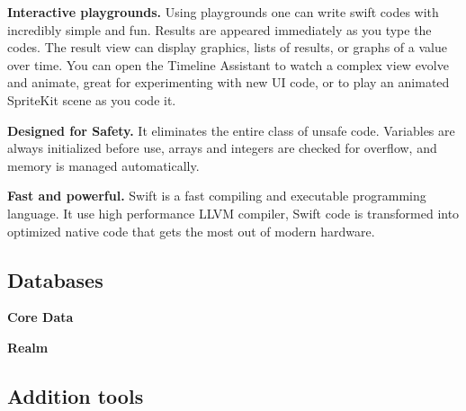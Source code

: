 \textbf{Interactive playgrounds.}
Using playgrounds one can write swift codes with incredibly simple and fun.
Results are appeared immediately as you type the codes. The result view
can display graphics, lists of results, or graphs of a value over time.
You can open the Timeline Assistant to watch a complex view evolve and animate,
great for experimenting with new UI code, or to play an animated SpriteKit
scene as you code it.

\textbf{Designed for Safety.}
It eliminates the entire class of unsafe code. Variables are always initialized
before use, arrays and integers are checked for overflow, and memory is
managed automatically.

\textbf{Fast and powerful.}
Swift is a fast compiling and executable programming language. It use high
performance LLVM compiler, Swift code is transformed into optimized native code
that gets the most out of modern hardware.


\subsection{Databases}

\textbf{Core Data}

\textbf{Realm}

\subsection{Addition tools}



\pagebreak